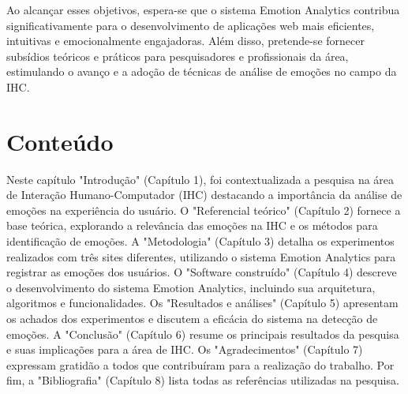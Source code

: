 Ao alcançar esses objetivos, espera-se que o sistema Emotion Analytics contribua significativamente para o desenvolvimento de aplicações web mais eficientes, intuitivas e emocionalmente engajadoras. Além disso, pretende-se fornecer subsídios teóricos e práticos para pesquisadores e profissionais da área, estimulando o avanço e a adoção de técnicas de análise de emoções no campo da IHC.

\section{Conteúdo}

Neste capítulo "Introdução" (Capítulo 1), foi contextualizada a pesquisa na área de Interação Humano-Computador (IHC) destacando a importância da análise de emoções na experiência do usuário. O "Referencial teórico" (Capítulo 2) fornece a base teórica, explorando a relevância das emoções na IHC e os métodos para identificação de emoções. A "Metodologia" (Capítulo 3) detalha os experimentos realizados com três sites diferentes, utilizando o sistema Emotion Analytics para registrar as emoções dos usuários. O "Software construído" (Capítulo 4) descreve o desenvolvimento do sistema Emotion Analytics, incluindo sua arquitetura, algoritmos e funcionalidades. Os "Resultados e análises" (Capítulo 5) apresentam os achados dos experimentos e discutem a eficácia do sistema na detecção de emoções. A "Conclusão" (Capítulo 6) resume os principais resultados da pesquisa e suas implicações para a área de IHC. Os "Agradecimentos" (Capítulo 7) expressam gratidão a todos que contribuíram para a realização do trabalho. Por fim, a "Bibliografia" (Capítulo 8) lista todas as referências utilizadas na pesquisa.

